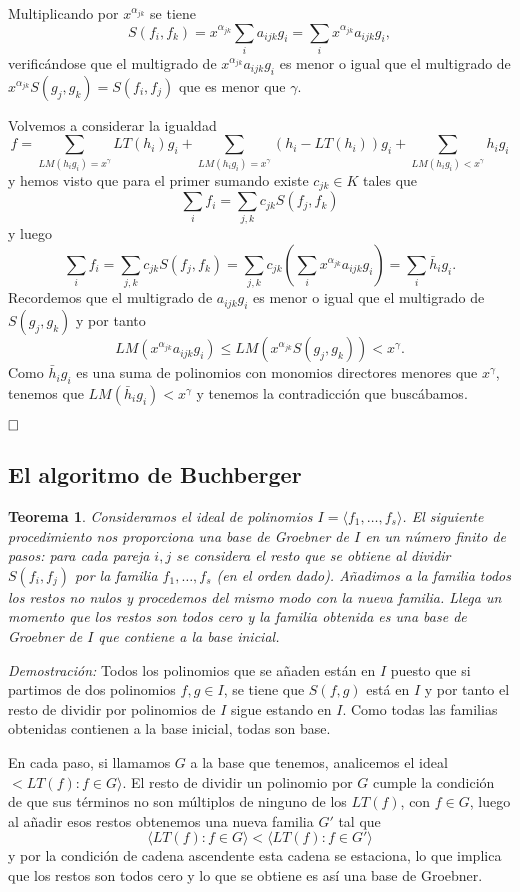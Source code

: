 \documentclass[12pt]{article}
\newtheorem{theorem}{Teorema}[section]
\begin{document}
Multiplicando por $x^{\alpha_{jk}}$ se tiene $$S(f_i, f_k) = x^{\alpha_{jk}} \sum_i a_{ijk}g_i = \sum_i x^{\alpha_{jk}}a_{ijk}g_i,$$ verificándose que el multigrado de $x^{\alpha_{jk}}a_{ijk}g_i$ es menor o igual que el multigrado de $x^{\alpha_{jk}}S(g_j,g_k) = S(f_i,f_j)$ que es menor que $\gamma$.

Volvemos a considerar la igualdad $$f = \sum_{LM(h_ig_i)=x^\gamma}LT(h_i)g_i + \sum_{LM(h_ig_i)=x^\gamma}(h_i -LT(h_i))g_i + \sum_{LM(h_ig_i)<x^\gamma}h_ig_i$$ y hemos visto que para el primer sumando existe $c_{jk} \in K$ tales que $$\sum_i f_i = \sum_{j,k} c_{jk} S(f_j, f_k)$$ y luego $$\sum_i f_i = \sum_{j,k}c_{jk}S(f_j,f_k) = \sum_{j,k}c_{jk}(\sum_ix^{\alpha_{jk}}a_{ijk}g_i) = \sum_i \bar{h}_ig_i.$$ Recordemos que el multigrado de $a_{ijk}g_i$ es menor o igual que el multigrado de $S(g_j,g_k)$ y por tanto $$LM(x^{\alpha_{jk}}a_{ijk}g_i) \leq LM(x^{\alpha_{jk}}S(g_j, g_k)) < x^\gamma.$$ Como $\bar{h}_ig_i$ es una suma de polinomios con monomios directores menores que $x^\gamma$, tenemos que $LM(\bar{h}_ig_i) < x^\gamma$ y tenemos la contradicción que buscábamos. 

$\hfill \square$

\subsection{El algoritmo de Buchberger}

\begin{theorem}Consideramos el ideal de polinomios $I = \langle f_1, \ldots, f_s \rangle$. El siguiente procedimiento nos proporciona una base de Groebner de $I$ en un número finito de pasos: para cada pareja $i,j$ se considera el resto que se obtiene al dividir $S(f_i,f_j)$ por la familia $f_1, \ldots, f_s$ (en el orden dado). Añadimos a la familia todos los restos no nulos y procedemos del mismo modo con la nueva familia. Llega un momento que los restos son todos cero y la familia obtenida es una base de Groebner de $I$ que contiene a la base inicial.
\end{theorem}
\emph{Demostración: }Todos los polinomios que se añaden están en $I$ puesto que si partimos de dos polinomios $f,g \in I$, se tiene que $S(f,g)$ está en $I$ y por tanto el resto de dividir por polinomios de $I$ sigue estando en $I$. Como todas las familias obtenidas contienen a la base inicial, todas son base.

En cada paso, si llamamos $G$ a la base que tenemos, analicemos el ideal $<LT(f) : f \in G \rangle.$ El resto de dividir un polinomio por $G$ cumple la condición de que sus términos no son múltiplos de ninguno de los $LT(f)$, con $f \in G$, luego al añadir esos restos obtenemos una nueva familia $G'$ tal que $$\langle LT(f) : f \in G \rangle < \langle LT(f): f \in G' \rangle$$ y por la condición de cadena ascendente esta cadena se estaciona, lo que implica que los restos son todos cero y lo que se obtiene es así una base de Groebner.
\end{document}

